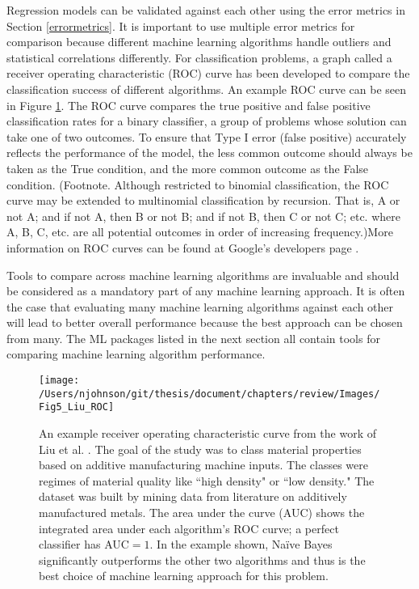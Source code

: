 Regression models can be validated against each other using the error metrics in Section \ref{errormetrics}. It is important to use multiple error metrics for comparison because different machine learning algorithms handle outliers and statistical correlations differently. For classification problems, a graph called a receiver operating characteristic (ROC) curve has been developed to compare the classification success of different algorithms. An example ROC curve can be seen in Figure \ref{ROC}. The ROC curve compares the true positive and false positive classification rates for a binary classifier, a group of problems whose solution can take one of two outcomes. To ensure that Type I error (false positive) accurately reflects the performance of the model, the less common outcome should always be taken as the True condition, and the more common outcome as the False condition. (Footnote. Although restricted to binomial classification, the ROC curve may be extended to multinomial classification by recursion. That is, A or not A; and if not A, then B or not B; and if not B, then C or not C; etc. where A, B, C, etc. are all potential outcomes in order of increasing frequency.)More information on ROC curves can be found at Google's developers page \cite{GoogleROC}.

Tools to compare across machine learning algorithms are invaluable and should be considered as a mandatory part of any machine learning approach. It is often the case that evaluating many machine learning algorithms against each other will lead to better overall performance because the best approach can be chosen from many. The ML packages listed in the next section all contain tools for comparing machine learning algorithm performance.

\begin{figure}
	\texttt{[image: /Users/njohnson/git/thesis/document/chapters/review/Images/Fig5\_Liu\_ROC]}
	\caption{An example receiver operating characteristic curve from the work of Liu et al. \cite{Liu2020}. The goal of the study was to class material properties based on additive manufacturing machine inputs. The classes were regimes of material quality like ``high density" or ``low density." The dataset was built by mining data from literature on additively manufactured metals. The area under the curve (AUC) shows the integrated area under each algorithm's ROC curve; a perfect classifier has AUC$=1$. In the example shown, Na\"ive Bayes significantly outperforms the other two algorithms and thus is the best choice of machine learning approach for this problem.}
	\label{ROC}
\end{figure}